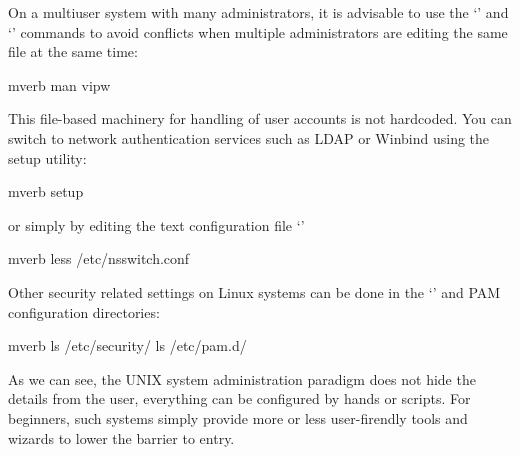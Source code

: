 On a multiuser system with many administrators, it is advisable to use
the `' and `' commands to avoid conflicts when multiple
administrators are editing the same file at the same time:
\begin{code}{mverb}
man vipw
\end{code}
This file-based machinery for handling of user accounts is not hardcoded.
You can switch to network authentication services such as LDAP or Winbind
using the setup utility:
\begin{code}{mverb}
setup
\end{code}
or simply by editing the text configuration file `'
\begin{code}{mverb}
less /etc/nsswitch.conf
\end{code}
Other security related settings on Linux systems can be done in
the `' and PAM configuration directories:
\begin{code}{mverb}
ls /etc/security/
ls /etc/pam.d/
\end{code}
As we can see, the UNIX system administration paradigm does not hide
the details from the user, everything can be configured by hands or scripts.
For beginners, such systems simply provide more or less user-firendly tools
and wizards to lower the barrier to entry.
